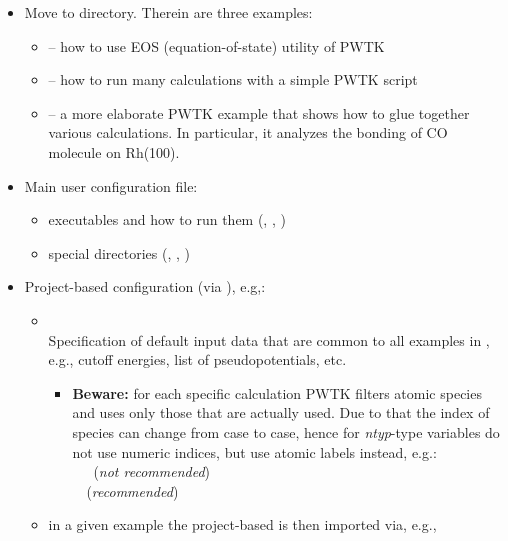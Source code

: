 \documentclass[landscape]{foils}
\begin{document}
\begin{itemize}
\item  Move to  directory. Therein are three
  examples:
  \begin{itemize}
  \item {} -- how to use EOS (equation-of-state) utility
    of PWTK
    \vspace{0.5em}
  \item {} -- how to run many calculations with a
    simple PWTK script
    \vspace{0.5em}
  \item {} -- a more elaborate PWTK example that
    shows how to glue together various calculations. In particular, it
    analyzes the bonding of CO molecule on Rh(100).
  \end{itemize}
\end{itemize}

\rightheader{}

\begin{itemize}
\item Main user configuration file: 
  \begin{itemize}
  \item executables and how to run them (, ,
    )
  \item special directories (, , )
  \end{itemize}
\item Project-based configuration (via ), e.g,:  
  \begin{itemize}
  \item {}\\[0.3em]
    Specification of default input data that are common to all examples in
    , e.g., cutoff energies, list of
    pseudopotentials, etc.
    \vspace{0.5em}
    {\small
      \begin{itemize}
      \item {\bf Beware:} for each specific calculation PWTK filters atomic
        species and uses only those that are actually used. Due to that
        the index of species can change from case to case, hence for
        {\em ntyp}-type variables do not use numeric indices, but use
        atomic labels instead, e.g.:\\
         ~~~({\red\em not recommended})\\
         ~~({\green\em recommended})
      \end{itemize}
    }
    \vspace{0.5em}
  \item in a given example the project-based  is
    then imported via, e.g.,
  \end{itemize}
\end{itemize}
\end{document}
